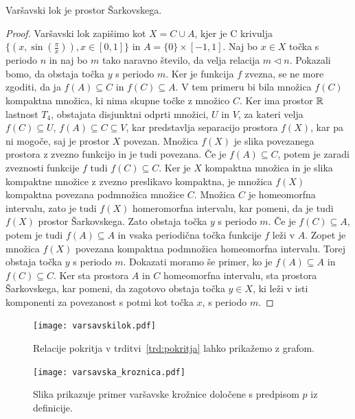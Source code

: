 \documentclass[../TG_magistrsko_delo_sections.tex]{subfiles}
\begin{document}
\begin{trditev}
Varšavski lok je prostor Šarkovskega.
\end{trditev}
\begin{proof}
Varšavski lok zapišimo kot $X = C \cup A$, kjer je C krivulja $\{(x, \sin(\frac{\pi}{x})), x\in [0, 1]\}$ in $A= \{0\} \times [-1, 1]$. Naj bo $x \in X$ točka s periodo $n$ in naj bo $m$ tako naravno število, da velja relacija $m \triangleleft n$. Pokazali bomo, da obstaja točka $y$ s periodo $m$. Ker je funkcija $f$ zvezna, se ne more zgoditi, da ja $f(A) \subseteq C$ in $f(C) \subseteq A$. V tem primeru bi bila množica $f(C)$ kompaktna množica, ki nima skupne točke z množico $C$. Ker ima prostor $\mathbb R$ lastnost $T_4$, obstajata disjunktni odprti množici, $U$ in $V$, za kateri velja $f(C) \subseteq U$, $f(A) \subseteq C \subseteq V$, kar predstavlja separacijo prostora $f(X)$, kar pa ni mogoče, saj je prostor $X$ povezan. Množica $f(X)$ je slika povezanega prostora z zvezno funkcijo in je tudi povezana. Če je $f(A) \subseteq C$, potem je zaradi zveznosti funkcije $f$ tudi $f(C) \subseteq C$. Ker je $X$ kompaktna množica in je slika kompaktne množice z zvezno preslikavo kompaktna, je množica $f(X)$ kompaktna povezana podmnožica množice $C$. Množica $C$ je homeomorfna intervalu, zato je tudi $f(X)$ homeromorfna intervalu, kar pomeni, da je tudi $f(X)$ prostor Šarkovskega. Zato obstaja točka $y$ s periodo $m$. Če je $f (C) \subseteq A $, potem je tudi $f (A) \subseteq A $ in vsaka periodična točka funkcije $f$ leži v $A$.  Zopet je množica $f(X)$ povezana kompaktna podmnožica homeomorfna intervalu. Torej obstaja točka $y$ s periodo $m$. 
Dokazati moramo še primer, ko je $f (A) \subseteq A $ in $f (C) \subseteq C $. Ker sta prostora $A$ in $C$ homeomorfna intervalu, sta prostora Šarkovskega, kar pomeni, da zagotovo obstaja točka $y \in X$, ki leži v isti komponenti za povezanost s potmi kot točka $x$, s periodo $m$.
\end{proof}

\begin{figure}[h]
  \centering
  \texttt{[image: varsavskilok.pdf]}
  \caption[Primer vektorske slike.]{Relacije pokritja v trditvi~\ref{trd:pokritja} lahko prikažemo z grafom.}
  \label{fig:varsavski_lok}
\end{figure}

\begin{figure}[h]
  \centering
  \texttt{[image: varsavska\_kroznica.pdf]}
  \caption[Varšavska krožnica]{Slika prikazuje primer varšavske krožnice določene s predpisom $p$ iz definicije.}
  \label{fig:varšavski}
\end{figure}
\end{document}
